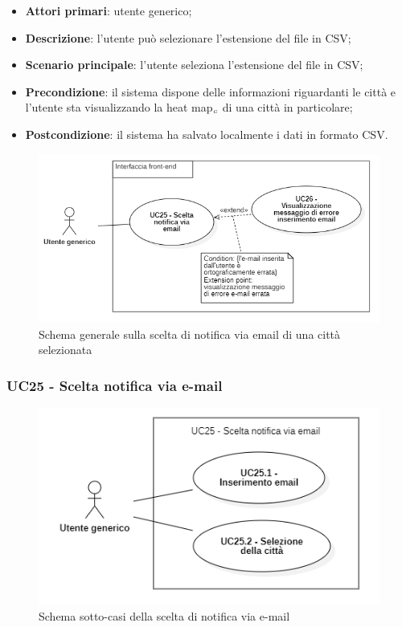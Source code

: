 \begin{itemize}
	\item \textbf{Attori primari}: utente generico;
	\item \textbf{Descrizione}: l’utente può selezionare l’estensione del file in CSV;
	\item \textbf{Scenario principale}: l’utente seleziona l’estensione del file in CSV;
	\item \textbf{Precondizione}: il sistema dispone delle informazioni riguardanti le città e  l’utente sta visualizzando la heat map$_{\scaleto{G}{3pt}}$ di una città in particolare;
	\item \textbf{Postcondizione}: il sistema ha salvato localmente i dati in formato CSV.
\end{itemize}


\begin{center}
	\begin{figure}[H]
		\centering\includegraphics[scale=0.7]{../immagini/attori_casi/UC_25_26.png}
		\caption{Schema generale sulla scelta di notifica via email di una città selezionata}
	\end{figure}
\end{center}

\subsubsection{UC25 - Scelta notifica via e-mail }\label{CasiDUsoCasiDUsoFacoltativiTraUnUtenteEIlFrontEndElencoCasiDUsoUC15NotificaViaEmailDiUnaCittaSelezionata}

\begin{center}
	\begin{figure}[H]
		\centering\includegraphics[scale=0.7]{../immagini/attori_casi/UC_25_1_2.png}
		\caption{Schema sotto-casi della scelta di notifica via e-mail}
	\end{figure}
\end{center}

